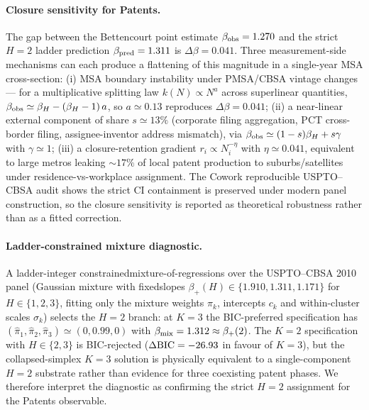 \paragraph{Closure sensitivity for Patents.} The gap between the Bettencourt point estimate $\beta_{\rm obs}=1.270$ and the strict $H=2$ ladder prediction $\beta_{\rm pred}=1.311$ is $\Delta\beta=0.041$. Three measurement-side mechanisms can each produce a flattening of this magnitude in a single-year MSA cross-section: (i) MSA boundary instability under PMSA/CBSA vintage changes — for a multiplicative splitting law $k(N)\propto N^a$ across superlinear quantities, $\beta_{\rm obs}\simeq\beta_H-(\beta_H-1)\,a$, so $a\simeq 0.13$ reproduces $\Delta\beta=0.041$; (ii) a near-linear external component of share $s\simeq 13\%$ (corporate filing aggregation, PCT cross-border filing, assignee-inventor address mismatch), via $\beta_{\rm obs}\simeq(1-s)\beta_H+s\gamma$ with $\gamma\simeq 1$; (iii) a closure-retention gradient $r_i\propto N_i^{-\eta}$ with $\eta\simeq 0.041$, equivalent to large metros leaking $\sim 17\%$ of local patent production to suburbs/satellites under residence-vs-workplace assignment. The Cowork reproducible USPTO--CBSA audit shows the strict CI containment is preserved under modern panel construction, so the closure sensitivity is reported as theoretical robustness rather than as a fitted correction.

\paragraph{Ladder-constrained mixture diagnostic.} A ladder-integer constrained\linebreak mixture-of-regressions over the USPTO--CBSA 2010 panel (Gaussian mixture with fixed\linebreak slopes $\beta_+(H)\in\{1.910,1.311,1.171\}$ for $H\in\{1,2,3\}$, fitting only the mixture weights $\pi_k$, intercepts $c_k$ and within-cluster scales $\sigma_k$) selects the $H=2$ branch: at $K=3$ the BIC-preferred specification has $(\hat\pi_1,\hat\pi_2,\hat\pi_3)\simeq(0,0.99,0)$ with $\beta_{\rm mix}=1.312\approx\beta_+(2)$. The $K=2$ specification with $H\!\in\!\{2,3\}$ is BIC-rejected ($\Delta{\rm BIC}=-26.93$ in favour of $K=3$), but the collapsed-simplex $K=3$ solution is physically equivalent to a single-component $H=2$ substrate rather than evidence for three coexisting patent phases. We therefore interpret the diagnostic as confirming the strict $H=2$ assignment for the Patents observable.

